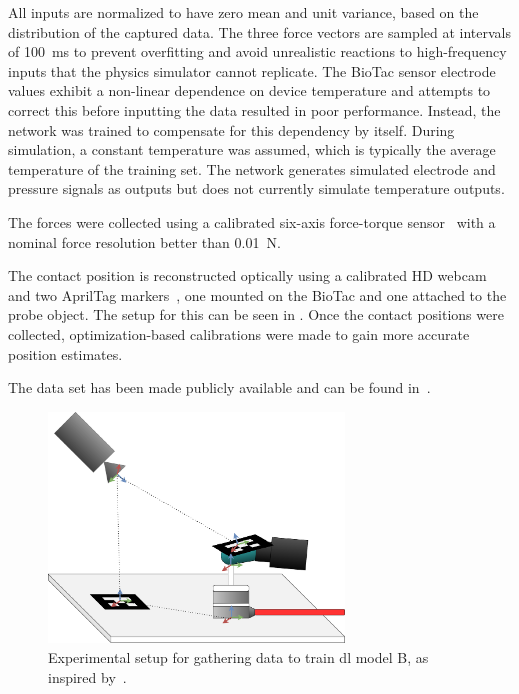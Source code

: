 All inputs are normalized to have zero mean and unit variance, based on the distribution of the captured data. The three force vectors are sampled at intervals of \SI{100}{\milli\second} to prevent overfitting and avoid unrealistic reactions to high-frequency inputs that the physics simulator cannot replicate. The BioTac sensor electrode values exhibit a non-linear dependence on device temperature and attempts to correct this before inputting the data resulted in poor performance. Instead, the network was trained to compensate for this dependency by itself. During simulation, a constant temperature was assumed, which is typically the average temperature of the training set. The network generates simulated electrode and pressure signals as outputs but does not currently simulate temperature outputs. \medskip

The forces were collected using a calibrated six-axis force-torque sensor~\cite{ati:-6-axis-force-and-torque-sensor-nano17-series} with a nominal force resolution better than \SI{0.01}{\newton}. 

The contact position is reconstructed optically using a calibrated HD webcam and two AprilTag markers~\cite{apriltag:-a-robust-and-flexible-visual-fiducial-system}, one mounted on the BioTac and one attached to the probe object. The setup for this can be seen in . Once the contact positions were collected, optimization-based calibrations were made to gain more accurate position estimates. \medskip

The data set has been made publicly available and can be found in~\cite{biotac-dataset}.

\begin{figure}[h]
	\begin{center}
		\includegraphics[width=0.7\textwidth]{chapters/1-tactile-perception/fig/drawio/biotac-sim-experimental-setup.pdf}
	\end{center}
	\caption{Experimental setup for gathering data to train \gls{dl} model B, as inspired by~\cite{simulation-of-the-syntouch-biotac-sensor}.}
	\label{fig:biotac-sim-experimental-setup}
\end{figure}

